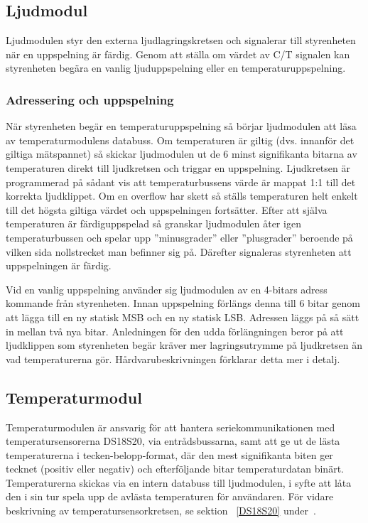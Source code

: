\documentclass[a4paper,11pt]{article}
\begin{document}
	\subsection{Ljudmodul}
		Ljudmodulen styr den externa ljudlagringskretsen och signalerar till styrenheten när en uppspelning är färdig. Genom att ställa om värdet av C/T signalen kan styrenheten begära en vanlig ljuduppspelning eller en temperaturuppspelning.

		\subsubsection{Adressering och uppspelning}
När styrenheten begär en temperaturuppspelning så börjar ljudmodulen att läsa av temperaturmodulens databuss. Om temperaturen är giltig (dvs. innanför det giltiga mätspannet) så skickar ljudmodulen ut de 6 minst signifikanta bitarna av temperaturen direkt till ljudkretsen och triggar en uppspelning. Ljudkretsen är programmerad på sådant vis att temperaturbussens värde är mappat 1:1 till det korrekta ljudklippet.  Om en overflow har skett så ställs temperaturen helt enkelt till det högsta giltiga värdet och uppspelningen fortsätter. Efter att själva temperaturen är färdiguppspelad så granskar ljudmodulen åter igen temperaturbussen och spelar upp ''minusgrader'' eller ''plusgrader'' beroende på vilken sida nollstrecket man befinner sig på. Därefter signaleras styrenheten att uppspelningen är färdig.

Vid en vanlig uppspelning använder sig ljudmodulen av en 4-bitars adress kommande från styrenheten. Innan uppspelning förlängs denna till 6 bitar genom att lägga till en ny statisk MSB och en ny statisk LSB. Adressen läggs på så sätt in mellan två nya bitar. Anledningen för den udda förlängningen beror på att ljudklippen som styrenheten begär kräver mer lagringsutrymme på ljudkretsen än vad temperaturerna gör. Hårdvarubeskrivningen förklarar detta mer i detalj.

	\subsection{Temperaturmodul}

	Temperaturmodulen är ansvarig för att hantera seriekommunikationen med 
	temperatursensorerna DS18S20, via entrådsbussarna, samt att ge ut de lästa temperaturerna
	i tecken-belopp-format, där den mest signifikanta biten ger tecknet (positiv eller negativ) och efterföljande bitar temperaturdatan binärt.
	Temperaturerna skickas via en intern databuss till ljudmodulen, i syfte att låta den i sin tur spela upp de avlästa temperaturen för användaren. 
	För vidare beskrivning av temperatursensorkretsen, se sektion ~\ref{DS18S20} under~.
\end{document}
